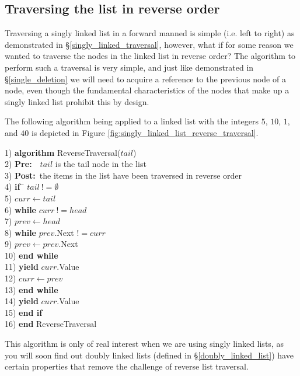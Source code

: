 \subsection{Traversing the list in reverse order}
Traversing a singly linked list in a forward manned is simple (i.e. left to right) as demonstrated in \S\ref{singly_linked_traversal}, however, what if for some reason we wanted to traverse the nodes in the linked list in reverse order? The algorithm to perform such a traversal is very simple, and just like demonstrated in \S\ref{single_deletion} we will need to acquire a reference to the previous node of a node, even though the fundamental characteristics of the nodes that make up a singly linked list prohibit this by design.

The following algorithm being applied to a linked list with the integers $5$, $10$, $1$, and $40$ is depicted in Figure \ref{fig:singly_linked_list_reverse_traversal}.

\begin{tabbing}
1)  \textbf{alg}\= \textbf{orithm} ReverseTraversal($tail$) \\
2)  \> \textbf{Pre:}~~$tail$ is the tail node in the list \\
3)  \> \textbf{Post:}~the items in the list have been traversed in reverse order \\
4)  \> \textbf{if}~\= $tail~!= \emptyset$ \\
5)  \> \> $curr \leftarrow tail$ \\
6)  \> \> \textbf{whi}\= \textbf{le} $curr~!= head$ \\
7)  \> \> \> $prev \leftarrow head$ \\
8)  \> \> \> \textbf{whi}\= \textbf{le} $prev$.Next $!= curr$ \\
9)  \> \> \> \> $prev \leftarrow prev$.Next \\
10) \> \> \> \textbf{end while} \\
11) \> \> \> \textbf{yield} $curr$.Value \\
12) \> \> \> $curr \leftarrow prev$ \\
13) \> \> \textbf{end while} \\
14) \> \> \textbf{yield} $curr$.Value \\
15) \> \textbf{end if} \\
16) \textbf{end} ReverseTraversal \\
\end{tabbing}

This algorithm is only of real interest when we are using singly linked lists, as you will soon find out doubly linked lists (defined in \S\ref{doubly_linked_list}) have certain properties that remove the challenge of reverse list traversal.

